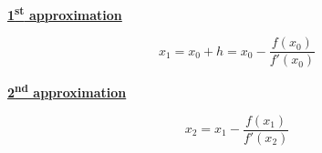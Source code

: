 \documentclass[10pt, twoside, a4paper]{article}
\begin{document}
\vskip20pt

\begin{center}
  \centering
  \textbf{\underline{ 1\textsuperscript{st} approximation }}
\end{center}
\begin{equation*}
  x_1=x_0+h=x_0-\frac{f(x_0)}{f'(x_0)}
\end{equation*}

\vskip10pt
\begin{center}
  \textbf{\underline{ 2\textsuperscript{nd} approximation }}
\end{center}
  \begin{equation*}
    x_2=x_1-\frac{f(x_1)}{f'(x_2)}
  \end{equation*}
\end{document}
